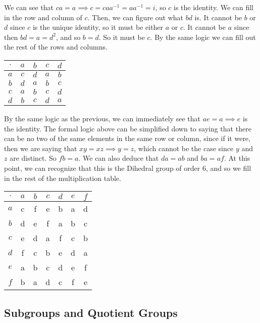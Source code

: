   \begin{solution}
    We can see that $ca = a \implies c = ca a^{-1} = a a^{-1} = i$, so $c$ is the identity. We can fill in the row and column of $c$. Then, we can figure out what $bd$ is. It cannot be $b$ or $d$ since $c$ is the unique identity, so it must be either $a$ or $c$. It cannot be $a$ since then $bd = a = d^2$, and so $b = d$. So it must be $c$. By the same logic we can fill out the rest of the rows and columns. 

    \begin{tabular}{c|cccc}
      $\cdot$ & $a$ & $b$ & $c$ & $d$ \\
      \hline
      $a$ & $c$ & $d$ & $a$ & $b$ \\
      $b$ & $d$ & $a$ & $b$ & $c$ \\
      $c$ & $a$ & $b$ & $c$ & $d$ \\
      $d$ & $b$ & $c$ & $d$ & $a$ \\
    \end{tabular}

    By the same logic as the previous, we can immediately see that $ae = a \implies e$ is the identity. The formal logic above can be simplified down to saying that there can be no two of the same elements in the same row or column, since if it were, then we are saying that $xy = xz \implies y = z$, which cannot be the case since $y$ and $z$ are distinct. So $fb = a$. We can also deduce that $da = ab$ and $ba = af$. At this point, we can recognize that this is the Dihedral group of order $6$, and so we fill in the rest of the multiplication table. 

    \begin{tabular}{c|cccccc}
      $\cdot$ & $a$ & $b$ & $c$ & $d$ & $e$ & $f$ \\
      \hline
      $a$ & c & f & e & b & a & d \\
      $b$ & d & e & f & a & b & c \\
      $c$ & e & d & a & f & c & b \\
      $d$ & f & c & b & e & d & a \\
      $e$ & a & b & c & d & e & f \\
      $f$ & b & a & d & c & f & e
    \end{tabular}
  \end{solution}

\subsection{Subgroups and Quotient Groups}

